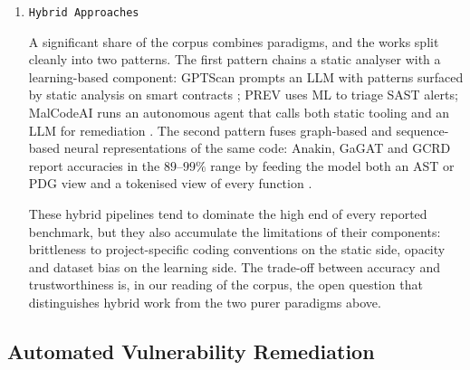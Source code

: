 \begin{enumerate}
Reported accuracies on closed benchmarks routinely fall in the
$82$--$99\%$ range. However, several careful evaluations point out
that these scores degrade sharply when the test set is drawn from a
different project distribution \citep{placeholder-llm-detection-eval},
raising serious questions about the generalisation capability of
learning-based detectors beyond the corpora they were trained on.

A small number of studies use \emph{classical} machine learning rather
than deep learning, typically random forests or SVMs over hand-crafted
metrics, and report comparable performance on narrow targets while
remaining substantially cheaper to train. We mention them not because
they dominate the corpus, they do not, but because they often serve as
the ``simple baseline'' that the deep-learning contributions need to
beat.

\item \texttt{Hybrid Approaches}
\label{subsubsec:rw-hybrid}

A significant share of the corpus combines paradigms, and the works
split cleanly into two patterns. The first pattern chains a static
analyser with a learning-based component: GPTScan prompts an LLM with
patterns surfaced by static analysis on smart contracts
\citep{placeholder-gptscan}; PREV uses ML to triage SAST alerts;
MalCodeAI runs an autonomous agent that calls both static tooling and
an LLM for remediation \citep{placeholder-malcodeai}. The second
pattern fuses graph-based and sequence-based neural representations of
the same code: Anakin, GaGAT and GCRD report accuracies in the
$89$--$99\%$ range by feeding the model both an AST or PDG view and a
tokenised view of every function
\citep{placeholder-anakin,placeholder-gagat}.

These hybrid pipelines tend to dominate the high end of every reported
benchmark, but they also accumulate the limitations of their
components: brittleness to project-specific coding conventions on the
static side, opacity and dataset bias on the learning side. The
trade-off between accuracy and trustworthiness is, in our reading of
the corpus, the open question that distinguishes hybrid work from the
two purer paradigms above.

    
\end{enumerate}

\subsection{Automated Vulnerability Remediation}
\label{subsec:rw-apr}

